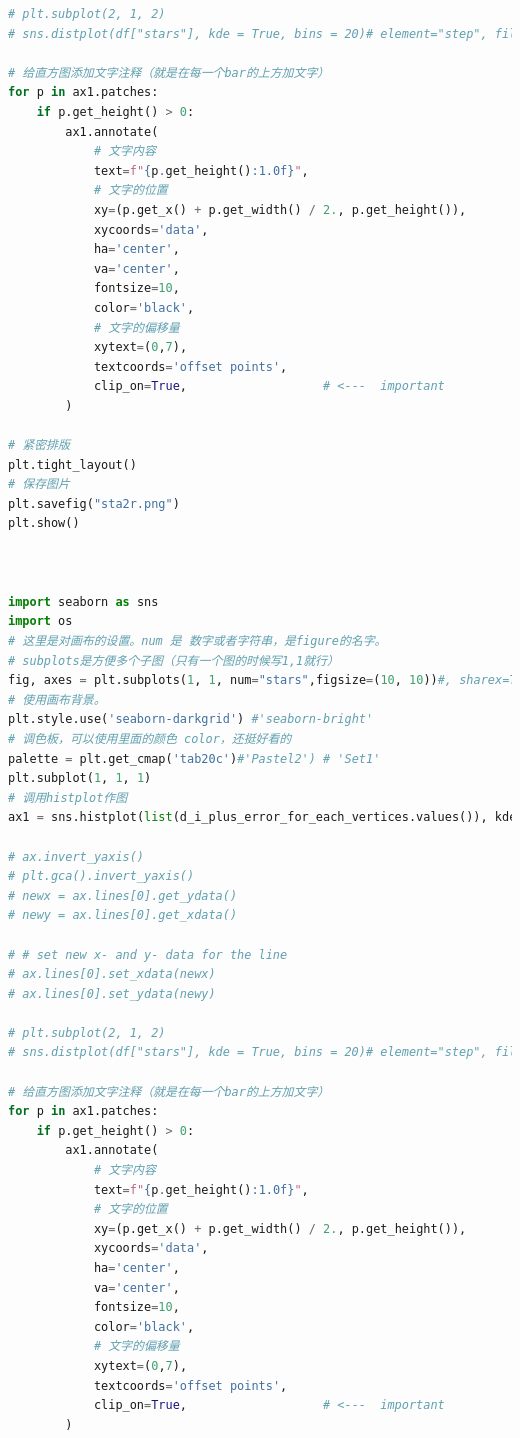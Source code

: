 \documentclass[withoutpreface,bwprint]{cumcmthesis} %
\begin{document}
\begin{appendices}
\begin{lstlisting}[language=python]
# plt.subplot(2, 1, 2)
# sns.distplot(df["stars"], kde = True, bins = 20)# element="step", fill=False)

# 给直方图添加文字注释（就是在每一个bar的上方加文字）
for p in ax1.patches:
    if p.get_height() > 0:
        ax1.annotate(
            # 文字内容
            text=f"{p.get_height():1.0f}",
            # 文字的位置
            xy=(p.get_x() + p.get_width() / 2., p.get_height()), 
            xycoords='data',
            ha='center', 
            va='center', 
            fontsize=10, 
            color='black',
            # 文字的偏移量
            xytext=(0,7), 
            textcoords='offset points',
            clip_on=True,                   # <---  important
        )

# 紧密排版
plt.tight_layout()
# 保存图片
plt.savefig("sta2r.png")
plt.show()



import seaborn as sns
import os
# 这里是对画布的设置。num 是 数字或者字符串，是figure的名字。
# subplots是方便多个子图（只有一个图的时候写1,1就行）
fig, axes = plt.subplots(1, 1, num="stars",figsize=(10, 10))#, sharex=True)
# 使用画布背景。
plt.style.use('seaborn-darkgrid') #'seaborn-bright'
# 调色板，可以使用里面的颜色 color，还挺好看的
palette = plt.get_cmap('tab20c')#'Pastel2') # 'Set1' 
plt.subplot(1, 1, 1)
# 调用histplot作图
ax1 = sns.histplot(list(d_i_plus_error_for_each_vertices.values()), kde = True, bins = 100, shrink = 1, color = palette.colors[0], edgecolor = palette.colors[-1])#"none")#, element="step")# element = "poly") # cumulative = True)

# ax.invert_yaxis() 
# plt.gca().invert_yaxis()
# newx = ax.lines[0].get_ydata()
# newy = ax.lines[0].get_xdata()

# # set new x- and y- data for the line
# ax.lines[0].set_xdata(newx)
# ax.lines[0].set_ydata(newy)

# plt.subplot(2, 1, 2)
# sns.distplot(df["stars"], kde = True, bins = 20)# element="step", fill=False)

# 给直方图添加文字注释（就是在每一个bar的上方加文字）
for p in ax1.patches:
    if p.get_height() > 0:
        ax1.annotate(
            # 文字内容
            text=f"{p.get_height():1.0f}",
            # 文字的位置
            xy=(p.get_x() + p.get_width() / 2., p.get_height()), 
            xycoords='data',
            ha='center', 
            va='center', 
            fontsize=10, 
            color='black',
            # 文字的偏移量
            xytext=(0,7), 
            textcoords='offset points',
            clip_on=True,                   # <---  important
        )


\end{lstlisting}
\end{appendices}
\end{document}
